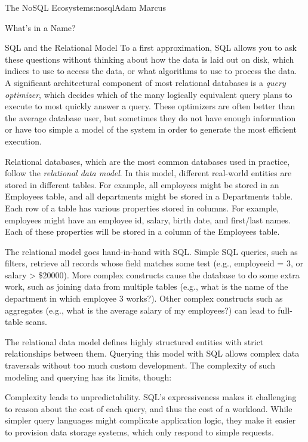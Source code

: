 \begin{aosachapter}{The NoSQL Ecosystem}{s:nosql}{Adam Marcus}
\begin{aosasect1}{What's in a Name?}
\begin{aosasect2}{SQL and the Relational Model}
To a first approximation, SQL allows you to ask these questions without
thinking about how the data is laid out on disk, which indices to use
to access the data, or what algorithms to use to process the data.  A
significant architectural component of most relational databases is a
\emph{query optimizer}, which decides which of the many logically
equivalent query plans to execute to most quickly answer a query.
These optimizers are often better than the average database user, but
sometimes they do not have enough information or have too simple a
model of the system in order to generate the most efficient execution.

Relational databases, which are the most common databases used in
practice, follow the \emph{relational data model}.  In this model, different
real-world entities are stored in different tables.  For example, all
employees might be stored in an Employees table, and all departments
might be stored in a Departments table.  Each row of a table has
various properties stored in columns.  For example, employees might
have an employee id, salary, birth date, and first/last names.  Each of these properties
will be stored in a column of the Employees table.

The relational model goes hand-in-hand with SQL\@.  Simple SQL queries,
such as filters, retrieve all records whose field matches some test
(e.g., employeeid = 3, or salary > \$20000).  More complex constructs
cause the database to do some extra work, such as joining data from
multiple tables (e.g., what is the name of the department in which
employee 3 works?).  Other complex constructs such as aggregates
(e.g., what is the average salary of my employees?) can lead to
full-table scans.

The relational data model defines highly structured entities with
strict relationships between them.  Querying this model with SQL
allows complex data traversals without too much custom development.
The complexity of such modeling and querying has its limits, though:

\begin{aosaitemize}

  \item Complexity leads to unpredictability.  SQL's expressiveness
  makes it challenging to reason about the cost of each query, and thus the
  cost of a workload.  While simpler query languages might complicate
  application logic, they make it easier to provision data storage
  systems, which only respond to simple requests.


\end{aosaitemize}
\end{aosasect2}
\end{aosasect1}
\end{aosachapter}
